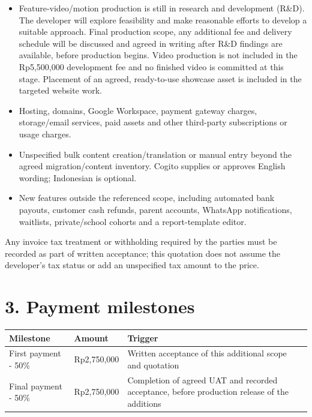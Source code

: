 \documentclass[11pt,a4paper]{article}
\newcounter{none}
\providecommand{\tightlist}{\setlength{\itemsep}{0pt}\setlength{\parskip}{0pt}}
\begin{document}
\begin{itemize}
\tightlist
\item
  Feature-video/motion production is still in research and development (R\&D). The developer will explore feasibility and make reasonable efforts to develop a suitable approach. Final production scope, any additional fee and delivery schedule will be discussed and agreed in writing after R\&D findings are available, before production begins. Video production is not included in the Rp5,500,000 development fee and no finished video is committed at this stage. Placement of an agreed, ready-to-use showcase asset is included in the targeted website work.
\item
  Hosting, domains, Google Workspace, payment gateway charges, storage/email services, paid assets and other third-party subscriptions or usage charges.
\item
  Unspecified bulk content creation/translation or manual entry beyond the agreed migration/content inventory. Cogito supplies or approves English wording; Indonesian is optional.
\item
  New features outside the referenced scope, including automated bank payouts, customer cash refunds, parent accounts, WhatsApp notifications, waitlists, private/school cohorts and a report-template editor.
\end{itemize}

Any invoice tax treatment or withholding required by the parties must be recorded as part of written acceptance; this quotation does not assume the developer's tax status or add an unspecified tax amount to the price.

\section{3. Payment milestones}\label{payment-milestones}

{\def\LTcaptype{none} %
\begin{longtable}[]{@{}
  >{\raggedright\arraybackslash}p{}
  >{\raggedleft\arraybackslash}p{}
  >{\raggedright\arraybackslash}p{}@{}}
\toprule\noalign{}
\begin{minipage}[b]{\linewidth}\raggedright
Milestone
\end{minipage} & \begin{minipage}[b]{\linewidth}\raggedleft
Amount
\end{minipage} & \begin{minipage}[b]{\linewidth}\raggedright
Trigger
\end{minipage} \\
\midrule\noalign{}
\endhead
\bottomrule\noalign{}
\endlastfoot
First payment - 50\% & Rp2,750,000 & Written acceptance of this additional scope and quotation \\
Final payment - 50\% & Rp2,750,000 & Completion of agreed UAT and recorded acceptance, before production release of the additions \\
\end{longtable}
}
\end{document}
